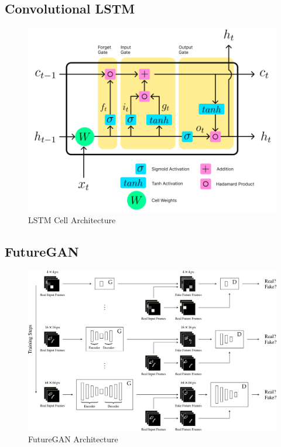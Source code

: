 \documentclass{scrartcl}
\begin{document}
\subsection{Convolutional LSTM}
\label{subsec:conv_lstm}

\begin{figure}[H]
	\begin{center}
		\includegraphics[width=1\textwidth]{figures/lstmcell_arch.png}
	\end{center}
	\caption{LSTM Cell Architecture}
	\label{fig:lstmcell_arch}
\end{figure}

\subsection{FutureGAN}
\label{subsec:futuregan}

\begin{figure}[H]
	\begin{center}
		\includegraphics[width=1\textwidth]{figures/futuregan_arch.png}
	\end{center}
	\caption{FutureGAN Architecture}
	\label{fig:futuregan_arch}
\end{figure}
\end{document}
